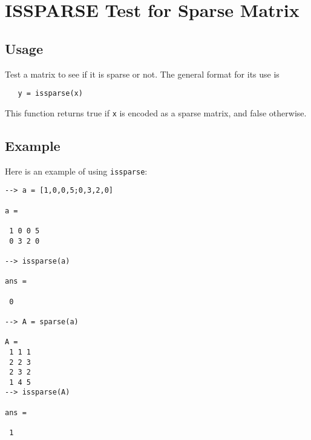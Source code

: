 \section{ISSPARSE Test for Sparse Matrix}

\subsection{Usage}

Test a matrix to see if it is sparse or not.  The general
format for its use is 
\begin{verbatim}
   y = issparse(x)
\end{verbatim}
This function returns true if \verb|x| is encoded as a sparse
matrix, and false otherwise.
\subsection{Example}

Here is an example of using \verb|issparse|:
\begin{verbatim}
--> a = [1,0,0,5;0,3,2,0]

a = 

 1 0 0 5 
 0 3 2 0 

--> issparse(a)

ans = 

 0 

--> A = sparse(a)

A = 
 1 1 1
 2 2 3
 2 3 2
 1 4 5
--> issparse(A)

ans = 

 1 
\end{verbatim}
